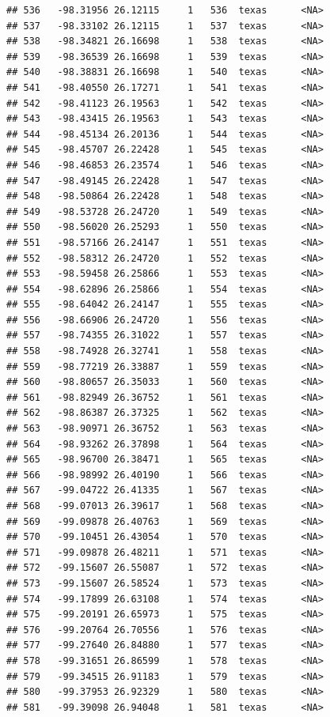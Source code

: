 \documentclass[
]{article}
\begin{document}
\begin{verbatim}
## 536   -98.31956 26.12115     1   536  texas      <NA>
## 537   -98.33102 26.12115     1   537  texas      <NA>
## 538   -98.34821 26.16698     1   538  texas      <NA>
## 539   -98.36539 26.16698     1   539  texas      <NA>
## 540   -98.38831 26.16698     1   540  texas      <NA>
## 541   -98.40550 26.17271     1   541  texas      <NA>
## 542   -98.41123 26.19563     1   542  texas      <NA>
## 543   -98.43415 26.19563     1   543  texas      <NA>
## 544   -98.45134 26.20136     1   544  texas      <NA>
## 545   -98.45707 26.22428     1   545  texas      <NA>
## 546   -98.46853 26.23574     1   546  texas      <NA>
## 547   -98.49145 26.22428     1   547  texas      <NA>
## 548   -98.50864 26.22428     1   548  texas      <NA>
## 549   -98.53728 26.24720     1   549  texas      <NA>
## 550   -98.56020 26.25293     1   550  texas      <NA>
## 551   -98.57166 26.24147     1   551  texas      <NA>
## 552   -98.58312 26.24720     1   552  texas      <NA>
## 553   -98.59458 26.25866     1   553  texas      <NA>
## 554   -98.62896 26.25866     1   554  texas      <NA>
## 555   -98.64042 26.24147     1   555  texas      <NA>
## 556   -98.66906 26.24720     1   556  texas      <NA>
## 557   -98.74355 26.31022     1   557  texas      <NA>
## 558   -98.74928 26.32741     1   558  texas      <NA>
## 559   -98.77219 26.33887     1   559  texas      <NA>
## 560   -98.80657 26.35033     1   560  texas      <NA>
## 561   -98.82949 26.36752     1   561  texas      <NA>
## 562   -98.86387 26.37325     1   562  texas      <NA>
## 563   -98.90971 26.36752     1   563  texas      <NA>
## 564   -98.93262 26.37898     1   564  texas      <NA>
## 565   -98.96700 26.38471     1   565  texas      <NA>
## 566   -98.98992 26.40190     1   566  texas      <NA>
## 567   -99.04722 26.41335     1   567  texas      <NA>
## 568   -99.07013 26.39617     1   568  texas      <NA>
## 569   -99.09878 26.40763     1   569  texas      <NA>
## 570   -99.10451 26.43054     1   570  texas      <NA>
## 571   -99.09878 26.48211     1   571  texas      <NA>
## 572   -99.15607 26.55087     1   572  texas      <NA>
## 573   -99.15607 26.58524     1   573  texas      <NA>
## 574   -99.17899 26.63108     1   574  texas      <NA>
## 575   -99.20191 26.65973     1   575  texas      <NA>
## 576   -99.20764 26.70556     1   576  texas      <NA>
## 577   -99.27640 26.84880     1   577  texas      <NA>
## 578   -99.31651 26.86599     1   578  texas      <NA>
## 579   -99.34515 26.91183     1   579  texas      <NA>
## 580   -99.37953 26.92329     1   580  texas      <NA>
## 581   -99.39098 26.94048     1   581  texas      <NA>

\end{verbatim}
\end{document}
